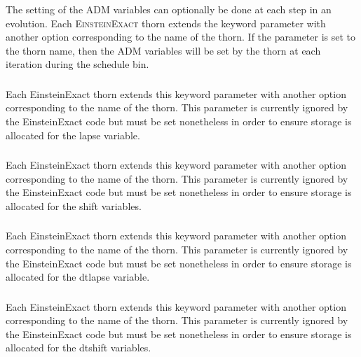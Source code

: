 \documentclass{article}
\begin{document}
\subsubsection{}
The setting of the ADM variables can optionally be done at each step in an
evolution. Each \textsc{EinsteinExact} thorn extends the
keyword parameter with another option corresponding to the name of the thorn.
If the parameter is set to the thorn name, then the ADM variables will be set
by the thorn at each iteration during the  schedule bin.

\subsubsection{}
Each EinsteinExact thorn extends this keyword parameter with another option
corresponding to the name of the thorn. This parameter is currently ignored
by the EinsteinExact code but must be set nonetheless in order to ensure
storage is allocated for the lapse variable.

\subsubsection{}
Each EinsteinExact thorn extends this keyword parameter with another option
corresponding to the name of the thorn. This parameter is currently ignored
by the EinsteinExact code but must be set nonetheless in order to ensure
storage is allocated for the shift variables.

\subsubsection{}
Each EinsteinExact thorn extends this keyword parameter with another option
corresponding to the name of the thorn. This parameter is currently ignored
by the EinsteinExact code but must be set nonetheless in order to ensure
storage is allocated for the dtlapse variable.

\subsubsection{}
Each EinsteinExact thorn extends this keyword parameter with another option
corresponding to the name of the thorn. This parameter is currently ignored
by the EinsteinExact code but must be set nonetheless in order to ensure
storage is allocated for the dtshift variables.
\end{document}

